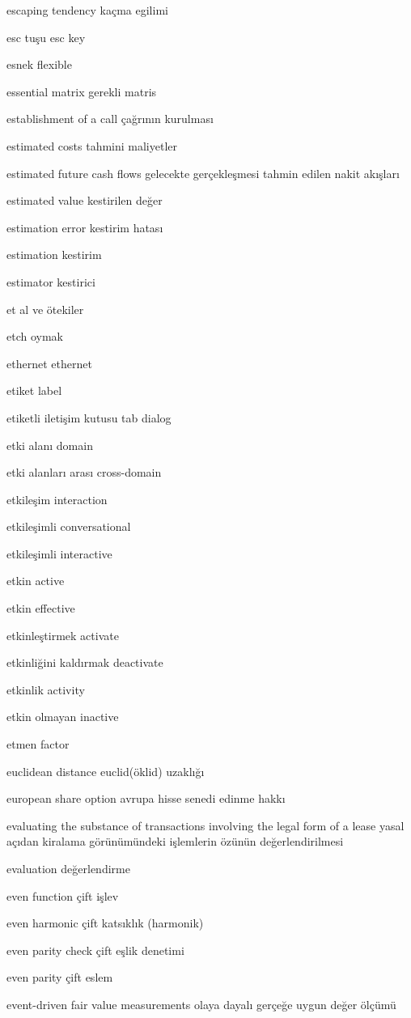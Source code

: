 \documentclass[12pt,fleqn]{article}\usepackage{../../common}
\begin{document}
escaping tendency kaçma egilimi

esc tuşu esc key

esnek flexible

essential matrix gerekli matris

establishment of a call çağrının kurulması

estimated costs tahmini maliyetler

estimated future cash flows gelecekte gerçekleşmesi tahmin edilen nakit akışları

estimated value kestirilen değer

estimation error kestirim hatası

estimation kestirim

estimator kestirici

et al ve ötekiler

etch oymak

ethernet ethernet

etiket label

etiketli iletişim kutusu tab dialog

etki alanı domain

etki alanları arası cross-domain

etkileşim interaction

etkileşimli conversational

etkileşimli interactive

etkin active

etkin effective

etkinleştirmek activate

etkinliğini kaldırmak deactivate

etkinlik activity

etkin olmayan inactive

etmen factor

euclidean distance euclid(öklid) uzaklığı

european share option avrupa hisse senedi edinme hakkı

evaluating the substance of transactions involving the legal form of a lease yasal açıdan kiralama görünümündeki işlemlerin özünün değerlendirilmesi

evaluation değerlendirme

even function çift işlev

even harmonic çift katsıklık (harmonik)

even parity check çift eşlik denetimi

even parity çift eslem

event-driven fair value measurements olaya dayalı gerçeğe uygun değer ölçümü
\end{document}
